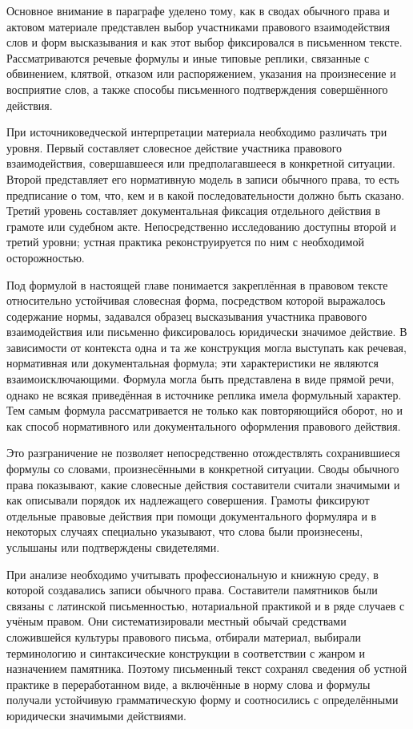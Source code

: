 Основное внимание в параграфе уделено тому, как в сводах обычного права и актовом материале представлен выбор участниками правового взаимодействия слов и форм высказывания и как этот выбор фиксировался в письменном тексте. Рассматриваются речевые формулы и иные типовые реплики, связанные с обвинением, клятвой, отказом или распоряжением, указания на произнесение и восприятие слов, а также способы письменного подтверждения совершённого действия.

При источниковедческой интерпретации материала необходимо различать три уровня. Первый составляет словесное действие участника правового взаимодействия, совершавшееся или предполагавшееся в конкретной ситуации. Второй представляет его нормативную модель в записи обычного права, то есть предписание о том, что, кем и в какой последовательности должно быть сказано. Третий уровень составляет документальная фиксация отдельного действия в грамоте или судебном акте. Непосредственно исследованию доступны второй и третий уровни; устная практика реконструируется по ним с необходимой осторожностью.

Под формулой в настоящей главе понимается закреплённая в правовом тексте относительно устойчивая словесная форма, посредством которой выражалось содержание нормы, задавался образец высказывания участника правового взаимодействия или письменно фиксировалось юридически значимое действие. В зависимости от контекста одна и та же конструкция могла выступать как речевая, нормативная или документальная формула; эти характеристики не являются взаимоисключающими. Формула могла быть представлена в виде прямой речи, однако не всякая приведённая в источнике реплика имела формульный характер. Тем самым формула рассматривается не только как повторяющийся оборот, но и как способ нормативного или документального оформления правового действия.

Это разграничение не позволяет непосредственно отождествлять сохранившиеся формулы со словами, произнесёнными в конкретной ситуации. Своды обычного права показывают, какие словесные действия составители считали значимыми и как описывали порядок их надлежащего совершения. Грамоты фиксируют отдельные правовые действия при помощи документального формуляра и в некоторых случаях специально указывают, что слова были произнесены, услышаны или подтверждены свидетелями.

При анализе необходимо учитывать профессиональную и книжную среду, в которой создавались записи обычного права. Составители памятников были связаны с латинской письменностью, нотариальной практикой и в ряде случаев с учёным правом. Они систематизировали местный обычай средствами сложившейся культуры правового письма, отбирали материал, выбирали терминологию и синтаксические конструкции в соответствии с жанром и назначением памятника. Поэтому письменный текст сохранял сведения об устной практике в переработанном виде, а включённые в норму слова и формулы получали устойчивую грамматическую форму и соотносились с определёнными юридически значимыми действиями.

